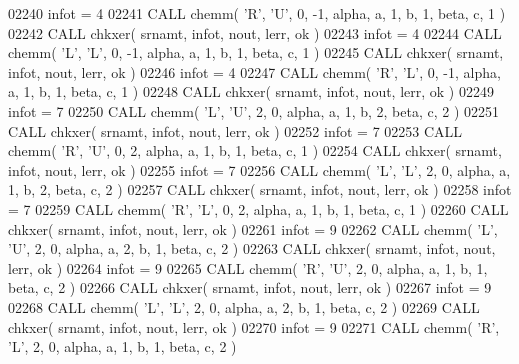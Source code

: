 \begin{DoxyCode}
02240       infot = 4
02241       \textcolor{keyword}{CALL }chemm( \textcolor{stringliteral}{'R'}, \textcolor{stringliteral}{'U'}, 0, -1, alpha, a, 1, b, 1, beta, c, 1 )
02242       \textcolor{keyword}{CALL }chkxer( srnamt, infot, nout, lerr, ok )
02243       infot = 4
02244       \textcolor{keyword}{CALL }chemm( \textcolor{stringliteral}{'L'}, \textcolor{stringliteral}{'L'}, 0, -1, alpha, a, 1, b, 1, beta, c, 1 )
02245       \textcolor{keyword}{CALL }chkxer( srnamt, infot, nout, lerr, ok )
02246       infot = 4
02247       \textcolor{keyword}{CALL }chemm( \textcolor{stringliteral}{'R'}, \textcolor{stringliteral}{'L'}, 0, -1, alpha, a, 1, b, 1, beta, c, 1 )
02248       \textcolor{keyword}{CALL }chkxer( srnamt, infot, nout, lerr, ok )
02249       infot = 7
02250       \textcolor{keyword}{CALL }chemm( \textcolor{stringliteral}{'L'}, \textcolor{stringliteral}{'U'}, 2, 0, alpha, a, 1, b, 2, beta, c, 2 )
02251       \textcolor{keyword}{CALL }chkxer( srnamt, infot, nout, lerr, ok )
02252       infot = 7
02253       \textcolor{keyword}{CALL }chemm( \textcolor{stringliteral}{'R'}, \textcolor{stringliteral}{'U'}, 0, 2, alpha, a, 1, b, 1, beta, c, 1 )
02254       \textcolor{keyword}{CALL }chkxer( srnamt, infot, nout, lerr, ok )
02255       infot = 7
02256       \textcolor{keyword}{CALL }chemm( \textcolor{stringliteral}{'L'}, \textcolor{stringliteral}{'L'}, 2, 0, alpha, a, 1, b, 2, beta, c, 2 )
02257       \textcolor{keyword}{CALL }chkxer( srnamt, infot, nout, lerr, ok )
02258       infot = 7
02259       \textcolor{keyword}{CALL }chemm( \textcolor{stringliteral}{'R'}, \textcolor{stringliteral}{'L'}, 0, 2, alpha, a, 1, b, 1, beta, c, 1 )
02260       \textcolor{keyword}{CALL }chkxer( srnamt, infot, nout, lerr, ok )
02261       infot = 9
02262       \textcolor{keyword}{CALL }chemm( \textcolor{stringliteral}{'L'}, \textcolor{stringliteral}{'U'}, 2, 0, alpha, a, 2, b, 1, beta, c, 2 )
02263       \textcolor{keyword}{CALL }chkxer( srnamt, infot, nout, lerr, ok )
02264       infot = 9
02265       \textcolor{keyword}{CALL }chemm( \textcolor{stringliteral}{'R'}, \textcolor{stringliteral}{'U'}, 2, 0, alpha, a, 1, b, 1, beta, c, 2 )
02266       \textcolor{keyword}{CALL }chkxer( srnamt, infot, nout, lerr, ok )
02267       infot = 9
02268       \textcolor{keyword}{CALL }chemm( \textcolor{stringliteral}{'L'}, \textcolor{stringliteral}{'L'}, 2, 0, alpha, a, 2, b, 1, beta, c, 2 )
02269       \textcolor{keyword}{CALL }chkxer( srnamt, infot, nout, lerr, ok )
02270       infot = 9
02271       \textcolor{keyword}{CALL }chemm( \textcolor{stringliteral}{'R'}, \textcolor{stringliteral}{'L'}, 2, 0, alpha, a, 1, b, 1, beta, c, 2 )

\end{DoxyCode}
